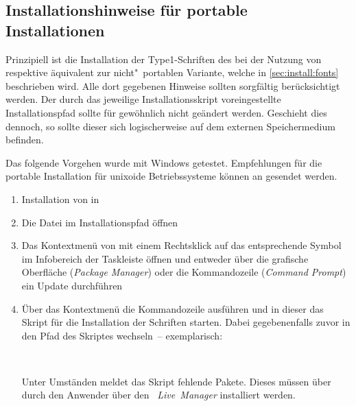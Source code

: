 \subsection{Installationshinweise für portable Installationen}
%
%
Prinzipiell ist die Installation der Type1-Schriften des \CDs bei der Nutzung 
von  respektive 
 äquivalent zur nicht"~portablen 
Variante, welche in \autoref{sec:install:fonts} beschrieben wird. Alle dort 
gegebenen Hinweise sollten sorgfältig berücksichtigt werden. Der durch das 
jeweilige Installationsskript voreingestellte Installationspfad sollte für 
gewöhnlich nicht geändert werden. Geschieht dies dennoch, so sollte dieser sich 
logischerweise auf dem externen Speichermedium   
 befinden.

Das folgende Vorgehen wurde mit Windows getestet. Empfehlungen für die portable 
Installation für unixoide Betriebssysteme können an \mailto{\TUDScriptContact} 
gesendet werden.
\begin{enumerate}
\item Installation von  in 
\item Die Datei  im Installationspfad öffnen
\item Das Kontextmenü von  mit einem 
  Rechtsklick auf das entsprechende Symbol im Infobereich der Taskleiste    
  öffnen und entweder über die grafische Oberfläche (\emph{Package Manager}) 
  oder die Kommandozeile (\emph{Command Prompt}) ein Update durchführen
\item Über das Kontextmenü die Kommandozeile ausführen und in dieser das Skript 
  für die Installation der Schriften  starten. 
  Dabei gegebenenfalls zuvor in den Pfad des Skriptes wechseln~-- exemplarisch:
  \begin{quoting}[leftmargin=1.5em,rightmargin=0pt]
  \newline%
  \,
  \end{quoting}
  Unter Umständen meldet das Skript fehlende Pakete. Dieses müssen über durch 
  den Anwender über den \emph{~Live~Manager} installiert werden.
\end{enumerate}

